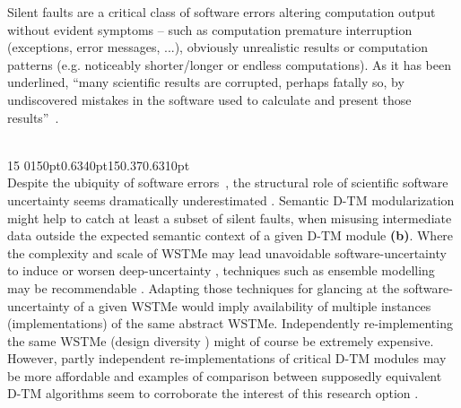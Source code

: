 \documentclass[a4paper,11pt]{article}
\makeatletter
\newenvironment{mtwocols}{\begin{multicols}{2}}{\end{multicols}}
\newcommand{\partitle}[1]{\noindent {\large\textbf{\textsf{#1}}}}
\newcommand{\DTM}{\ensuremath{\mbox{D-}\!\mbox{TM}}}
\def\newparshape{\parshape\@npshape0{}}
\def\@npshape#1#2#3{\ifx\\#3\expandafter\@@@npshape\else\expandafter\@@npshape\fi
{#1}{#2}{#3}}
\def\@@npshape#1#2#3#4#5{\ifnum#3>\z@\expandafter\@firstoftwo\else\expandafter\@secondoftwo\fi
{\expandafter\@@npshape\expandafter{\the\numexpr#1+1\relax}{#2 #4 #5}{\numexpr#3-1\relax}{#4}{#5}}{\@npshape{#1}{#2}}}
\def\@@@npshape#1#2#3{#1 #2 }
\newcommand{\myquote}[2]{{
\rlap{\hspace{\dimexpr0.63\columnwidth+\columnsep}\vspace{-#1}\colorbox{black!10}{
\em\small\begin{tabular}{L{\dimexpr0.63\columnwidth-\columnsep}}
\mbox{\hspace{1pt}}\2mm]
\end{tabular}}}}}
\makeatother
\begin{document}
\begin{mtwocols}
\partitle{Semantics and design diversity}
\bigskip\vspace{0mm}

\noindent Silent faults \cite{Hook_Kelly_2009} are a critical class of software errors altering computation output without evident symptoms -- such as computation premature interruption (exceptions, error messages, ...), obviously unrealistic results or computation patterns (e.g. noticeably shorter/longer or endless computations). As it has been underlined, ``many scientific results are corrupted, perhaps fatally so, by undiscovered mistakes in the software used to calculate and present those results''~\cite{Hatton_2007}. 

\newparshape{15}{0pt}{0.63\columnwidth}{4}{0pt}{\columnwidth}{15}{0.37\columnwidth}{0.63\columnwidth}{1}{0pt}{\columnwidth}\\
\myquote{67mm}{\vspace{0mm}Semantic modularization might help to catch at least a subset of silent faults, when misusing intermediate data outside the expected semantic context''\1mm]
``Where the complexity and scale may lead to deep uncertainty, techniques such as ensemble modelling may be recommendable\vspace{1mm}}
\noindent Despite the ubiquity of software errors~\cite{Lehman_1989,Lehman_Ramil_2002,Hook_Kelly_2009,Hatton_2007,Hatton_1997,Hatton_2012,Lehman_1996,Oberkampf_etal_2002,Wilson_2006}, the structural role of scientific software uncertainty seems dramatically underestimated  \cite{de_Rigo_F10002013,Cerf_2012}. Semantic {\DTM} modularization might help to catch at least a subset of silent faults, when misusing intermediate data outside the expected semantic context of a given {\DTM} module \textbf{(b)}. 
Where the complexity and scale of WSTMe may lead unavoidable software-uncertainty to induce or worsen deep-uncertainty \cite{de_Rigo_F10002013}, techniques such as ensemble modelling may be recommendable \cite{Lempert_2002,Kandlikar_etal_2005,Gober_Kirkwood_2010}. Adapting those techniques for glancing at the software-uncertainty of a given WSTMe would imply availability of multiple instances (implementations) of the same abstract WSTMe. 
Independently re-implementing the same WSTMe (design diversity \cite{Rebaudengo_2011}) might of course be extremely expensive. However, partly independent re-implementations of critical {\DTM} modules may be more affordable and examples of comparison between supposedly equivalent {\DTM} algorithms seem to corroborate the interest of this research option \cite{Cai_etal_2012,Beaudette_2008,Barnes_Jones_2011}.
\end{mtwocols}
\end{document}

